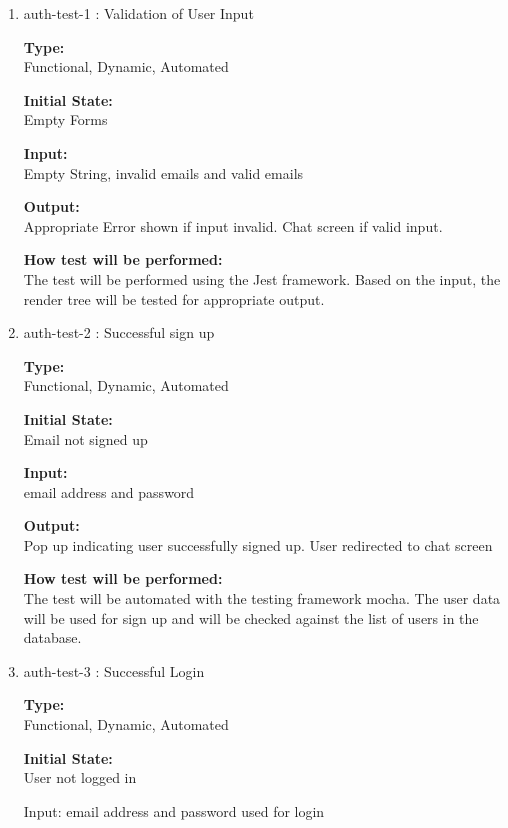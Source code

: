 \documentclass[12pt, titlepage]{article}
\begin{document}
\begin{enumerate}

\item{auth-test-1 : Validation of User Input\\}

\textbf{Type:}\\ Functional, Dynamic, Automated

\textbf{Initial State:}\\ Empty Forms
					
\textbf{Input:}\\ Empty String, invalid emails and valid emails 
					
\textbf{Output:}\\ Appropriate Error shown if input invalid. Chat screen if valid input.
					
\textbf{How test will be performed:}\\ The test will be performed using the Jest framework. Based on the input, the render tree will be tested for appropriate output.
					
\item{auth-test-2 : Successful sign up\\}

\textbf{Type:}\\ Functional, Dynamic, Automated 
					
\textbf{Initial State:}\\ Email not signed up
					
\textbf{Input:}\\ email address and password
					
\textbf{Output:}\\ Pop up indicating user successfully signed up. User redirected to chat screen
					
\textbf{How test will be performed:}\\ 
The test will be automated with the testing framework mocha. The user data will be used for sign up and will be checked against the list of users in the database.

\item{auth-test-3 : Successful Login\\}

\textbf{Type:}\\ Functional, Dynamic, Automated 
					
\textbf{Initial State:}\\ User not logged in
					
Input: email address and password used for login
					

\end{enumerate}
\end{document}

